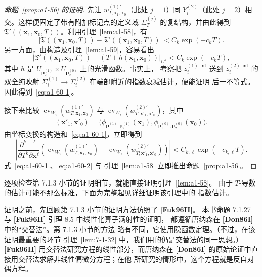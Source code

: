 \begin{proof}[命题~\ref{prop:a1-56} 的证明]
先让 $w_{T;\mathbf x_1,\mathbf x_0}^{(1)\prime}$（此处 $j=1$）同
$Y_i^{(2)}$（此处 $j=2$）相交。这样便固定了带有附加标记点的定义域
$\Sigma_T^{(j)}$ 的复结构，并由此得到
$\mathfrak T'((\mathbf x_1,\mathbf x_0,T))$。利用引理~\ref{lem:a1-58}，有
\[
 \left\lvert
 \mathfrak T((\mathbf x_1,\mathbf x_0,T))
 -\mathfrak T'((\mathbf x_1,\mathbf x_0,T))
 \right\rvert
 <C_k\exp(-c_kT).
\]
另一方面，由构造及引理~\ref{lem:a1-59}，容易看出
\[
 \left\lvert
 \mathfrak T'((\mathbf x_1,\mathbf x_0,T))
 -(T+h(\mathbf x_1,\mathbf x_0))
 \right\rvert_{C^k}
 <C_k\exp(-c_kT),
\]
其中 $h$ 是
$U_{\mathbf p_2^{(1)}}\times U_{\mathbf p_2^{(0)}}$ 上的光滑函数。事实上，
考察把 $z_i^{(1),\mathrm{int}}$ 送到 $z_i^{(2),\mathrm{int}}$ 的双全纯映射
$\Sigma_i^{(1)}\to\Sigma_i^{(2)}$ 在端部附近的指数衰减估计，便能证明
后一不等式。因此得到~\eqref{eq:a1-60-1}。

接下来比较
$\operatorname{ev}_{W_i}(w_{T;\mathbf x_1,\mathbf x_0}^{(1)\prime})$
与
$\operatorname{ev}_{W_i}(w_{T;\mathbf x'_1,\mathbf x'_0}^{(2)\prime})$，其中
\[
 (\mathbf x'_1,\mathbf x'_0)
 =\bigl(
 \overline\phi_{\mathbf p_1^{(1)},\mathbf p_2^{(1)}}(\mathbf x_1),
 \overline\phi_{\mathbf p_1^{(0)},\mathbf p_2^{(0)}}(\mathbf x_0)
 \bigr).
\]
由坐标变换的构造和~\eqref{eq:a1-60-1}，立即得到
\begin{equation}
 \left\lvert
 \frac{\partial^{k+\ell}}{\partial T^k\partial\mathbf x^\ell}
 \left(
 \operatorname{ev}_{W_i}(w_{T;\mathbf x_1,\mathbf x_0}^{(1)\prime})
 -
 \operatorname{ev}_{W_i}(w_{T;\mathbf x'_1,\mathbf x'_0}^{(2)\prime})
 \right)
 \right\rvert
 <C_{k,\ell}\exp(-c_{k,\ell}T).
\tag{A1.60.2}\label{eq:a1-60-2}
\end{equation}
式~\eqref{eq:a1-60-1}、\eqref{eq:a1-60-2} 与
引理~\ref{lem:a1-58} 立即推出命题~\ref{prop:a1-56}。
\end{proof}

逐项检查第 7.1.3 小节的证明细节，就能直接证明引理~\ref{lem:a1-58}。
由于 $T$-导数的估计可能不那么标准，下面为完整起见详细证明该引理中的
指数估计。

证明之前，先回顾第 7.1.3 小节的证明方法仿照了 \textbf{[Fuk96II]}。
本书命题 7.1.27 与 \textbf{[Fuk96II]} 引理 8.5 中线性化算子满射性的证明，
都遵循唐纳森在 \textbf{[Don86I]} 中的“交替法”。第 7.1.3 小节的方法
略有不同，它使用隐函数定理。（不过，在该证明最重要的环节
引理~\ref{lem:7-1-32} 中，我们用的仍是交替法的同一思想。）
\textbf{[Fuk96II]} 用交替法研究方程的线性部分，而唐纳森在
\textbf{[Don86I]} 的原始论证中直接用交替法求解非线性偏微分方程；在他
所研究的情形中，这个方程就是反自对偶方程。


